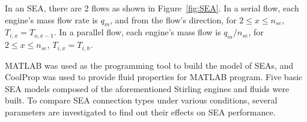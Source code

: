\documentclass[review,3p,10t]{elsarticle}
\begin{document}
In an SEA, there are 2 flows as shown in Figure~\ref{fig:SEA}. In a serial flow, each engine's mass flow rate is $q_m$, and from the flow's direction, for $2\leqslant{}x\leqslant{}n_{se}$, $T_{i,x} = T_{o,x-1}$. In a parallel flow, each engine's mass flow is $q_m/n_{se}$, for $2\leqslant{}x\leqslant{}n_{se}$, $T_{i,x} = T_{i,h}$.




MATLAB was used as the programming tool to build the model of SEAs, and CoolProp was used to provide fluid properties for MATLAB program. Five basic SEA models composed of the aforementioned Stirling engines and fluids were built. To compare SEA connection types under various conditions, several parameters are investigated to find out their effects on SEA performance.

%
\end{document}
